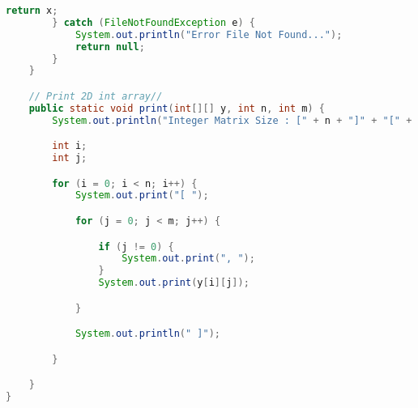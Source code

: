 \documentclass[11pt]{article}
\begin{document}
\begin{lstlisting}[language=Java]
            return x;
        } catch (FileNotFoundException e) {
            System.out.println("Error File Not Found...");
            return null;
        }
    }

    // Print 2D int array//
    public static void print(int[][] y, int n, int m) {
        System.out.println("Integer Matrix Size : [" + n + "]" + "[" + m + "]");

        int i;
        int j;

        for (i = 0; i < n; i++) {
            System.out.print("[ ");

            for (j = 0; j < m; j++) {

                if (j != 0) {
                    System.out.print(", ");
                }
                System.out.print(y[i][j]);

            }

            System.out.println(" ]");

        }

    }
}
\end{lstlisting}
\end{document}
